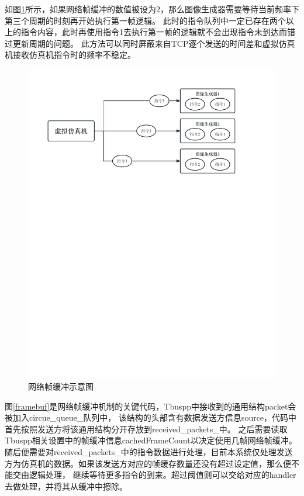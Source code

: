 \par
如图\ref{framebuffer}所示，如果网络帧缓冲的数值被设为2，那么图像生成器需要等待当前频率下第三个周期的时刻再开始执行第一帧逻辑。
此时的指令队列中一定已存在两个以上的指令内容，此时再使用指令1去执行第一帧的逻辑就不会出现指令未到达而错过更新周期的问题。
此方法可以同时屏蔽来自TCP逐个发送的时间差和虚拟仿真机接收仿真机指令时的频率不稳定。
\begin{figure}[h!]
    \begin{center}
        \includegraphics[width=\textwidth]{pictures/framebuffer.pdf}
        \caption{网络帧缓冲示意图}
        \label{framebuffer}
    \end{center}
\end{figure}
\par
图\ref{framebuf}是网络帧缓冲机制的关键代码，Tbuspp中接收到的通用结构packet会被加入circue\_queue\_队列中，
该结构的头部含有数据发送方信息source，代码中首先按照发送方将该通用结构分开存放到received\_packets\_中。
之后需要读取Tbuspp相关设置中的帧缓冲信息cachedFrameCount以决定使用几帧网络帧缓冲。
随后便需要对received\_packets\_中的指令数据进行处理，目前本系统仅处理发送方为仿真机的数据。如果该发送方对应的帧缓存数量还没有超过设定值，那么便不能交由逻辑处理，
继续等待更多指令的到来。超过阈值则可以交给对应的handler去做处理，并将其从缓冲中擦除。

